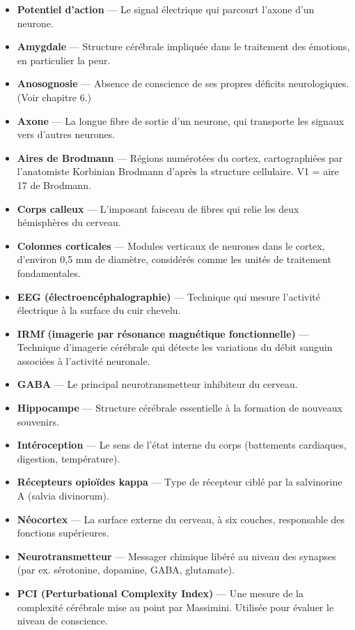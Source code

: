 \documentclass[11pt, twoside, openright]{book}
\begin{document}
\begin{itemize}
  \item \textbf{Potentiel d'action} --- Le signal électrique qui parcourt l'axone d'un neurone.
  \item \textbf{Amygdale} --- Structure cérébrale impliquée dans le traitement des émotions, en particulier la peur.
  \item \textbf{Anosognosie} --- Absence de conscience de ses propres déficits neurologiques. (Voir chapitre 6.)
  \item \textbf{Axone} --- La longue fibre de sortie d'un neurone, qui transporte les signaux vers d'autres neurones.
  \item \textbf{Aires de Brodmann} --- Régions numérotées du cortex, cartographiées par l'anatomiste Korbinian Brodmann d'après la structure cellulaire. V1 = aire 17 de Brodmann.
  \item \textbf{Corps calleux} --- L'imposant faisceau de fibres qui relie les deux hémisphères du cerveau.
  \item \textbf{Colonnes corticales} --- Modules verticaux de neurones dans le cortex, d'environ 0,5 mm de diamètre, considérés comme les unités de traitement fondamentales.
  \item \textbf{EEG (électroencéphalographie)} --- Technique qui mesure l'activité électrique à la surface du cuir chevelu.
  \item \textbf{IRMf (imagerie par résonance magnétique fonctionnelle)} --- Technique d'imagerie cérébrale qui détecte les variations du débit sanguin associées à l'activité neuronale.
  \item \textbf{GABA} --- Le principal neurotransmetteur inhibiteur du cerveau.
  \item \textbf{Hippocampe} --- Structure cérébrale essentielle à la formation de nouveaux souvenirs.
  \item \textbf{Intéroception} --- Le sens de l'état interne du corps (battements cardiaques, digestion, température).
  \item \textbf{Récepteurs opioïdes kappa} --- Type de récepteur ciblé par la salvinorine A (salvia divinorum).
  \item \textbf{Néocortex} --- La surface externe du cerveau, à six couches, responsable des fonctions supérieures.
  \item \textbf{Neurotransmetteur} --- Messager chimique libéré au niveau des synapses (par ex. sérotonine, dopamine, GABA, glutamate).
  \item \textbf{PCI (Perturbational Complexity Index)} --- Une mesure de la complexité cérébrale mise au point par Massimini. Utilisée pour évaluer le niveau de conscience.

\end{itemize}
\end{document}
